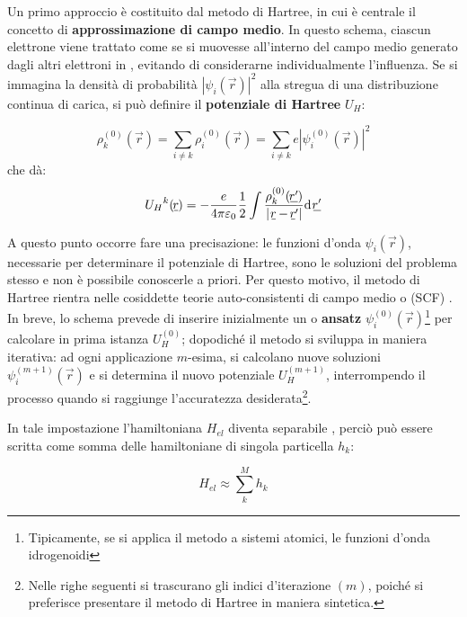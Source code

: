 Un primo approccio è costituito dal metodo di Hartree, in cui è centrale il concetto di \textbf{approssimazione di campo medio}. In questo schema, ciascun elettrone viene trattato come se si muovesse all'interno del campo medio generato dagli altri elettroni in , evitando di considerarne individualmente l'influenza. 
Se si immagina la densità di probabilità $|\psi_i({\vec{r}})|^2$ alla stregua di una distribuzione continua di carica, si può definire il \textbf{potenziale di Hartree} $U_H$:

\begin{equation}\label{eqn:distribuzione-di-carica}
    \rho_{k}^{(0)}(\vec{r}) = \sum_{i \neq k} \rho_{i}^{(0)}(\vec{r}) = 
    \sum_{i \neq k} e |\psi_{i}^{(0)}(\vec{r})|^2
\end{equation}
che dà:
\begin{equation}\label{eqn:potenziale-di-Hartree}
    {U_{H}}^{k}(\underline{\hspace{-0.1em}r\hspace{-0.05em}}) = -\frac{e}{4\pi\varepsilon_0}
    \frac12\int \frac{\rho_{k}^{(0)}(\underline{\hspace{-0.1em}r'\hspace{-0.05em}})}{|\,\underline{\hspace{-0.1em}r\hspace{-0.05em}}-\underline{\hspace{-0.1em}r\hspace{-0.05em}}'|} \text{d}\,{\underline{\hspace{-0.1em}r'\hspace{-0.05em}}}
\end{equation}

A questo punto occorre fare una precisazione: le funzioni d'onda $\psi_i({\vec{r}})$, necessarie per determinare il potenziale di Hartree, sono le soluzioni del problema stesso e non è possibile conoscerle a priori. Per questo motivo, il metodo di Hartree rientra nelle cosiddette teorie auto-consistenti di campo medio o  (SCF) . 
In breve, lo schema prevede di inserire inizialmente un  o \textbf{ansatz} $\psi_{i}^{(0)}(\vec{r})$\footnote{Tipicamente, se si applica il metodo a sistemi atomici, le funzioni d'onda idrogenoidi} per calcolare in prima istanza $U_{H}^{(0)}$; dopodiché il metodo si sviluppa in maniera iterativa: ad ogni applicazione $m$-esima, si calcolano nuove soluzioni $\psi_{i}^{(m+1)}(\vec{r})$ e si determina il nuovo potenziale $U_{H}^{(m+1)}$, interrompendo il processo quando si raggiunge l'accuratezza desiderata\footnote{Nelle righe seguenti si trascurano gli indici d'iterazione $(m)$, poiché si preferisce presentare il metodo di Hartree in maniera sintetica.}. 

In tale impostazione l'hamiltoniana $H_{el}$ diventa separabile \cite{modern_quantum_chem}, perciò può essere scritta come somma delle hamiltoniane di singola particella $h_k$:

\begin{equation}\label{eqn:hamiltoniana-separabile}
    H_{el} \approx \sum_{k}^{M} h_{k}
\end{equation}

